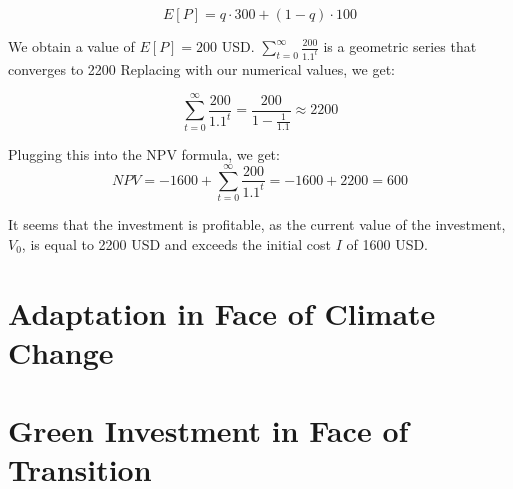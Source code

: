 \documentclass{article}
\begin{document}
\begin{equation}
    E[P] = q \cdot 300 + (1-q) \cdot 100
\end{equation}

We obtain a value of $E[P] = 200$ USD.
$\sum^{\infty}_{t=0} \frac{200}{1.1^t}$ is a geometric series that converges to 2200
Replacing with our numerical values, we get:

\begin{equation}
    \sum^{\infty}_{t=0} \frac{200}{1.1^t} = \frac{200}{1 - \frac{1}{1.1}} \approx 2200
\end{equation}

Plugging this into the NPV formula, we get:
\begin{equation}
    NPV = -1600 + \sum^{\infty}_{t=0} \frac{200}{1.1^t} = -1600 + 2200 = 600
\end{equation}

It seems that the investment is profitable, 
as the current value of the investment, $V_0$, is equal to 2200 USD
and exceeds the initial cost $I$ of 1600 USD.

\section{Adaptation in Face of Climate Change}

\section{Green Investment in Face of Transition}






\newpage
\end{document}
